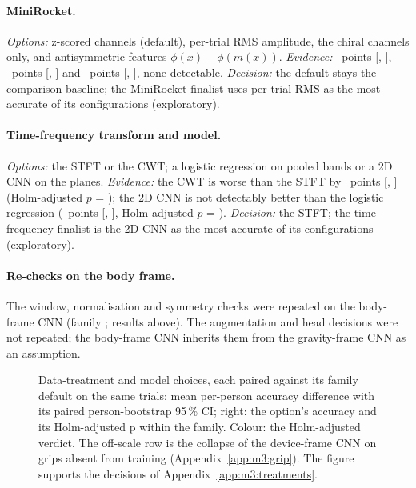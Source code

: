 \paragraph{MiniRocket.}
\emph{Options:} z-scored channels (default), per-trial RMS amplitude, the chiral channels only, and antisymmetric features $\phi(x) - \phi(m(x))$.
\emph{Evidence:} ~points [, ], ~points [, ] and ~points [, ], none detectable.
\emph{Decision:} the default stays the comparison baseline; the MiniRocket finalist uses per-trial RMS as the most accurate of its configurations (exploratory).

\paragraph{Time-frequency transform and model.}
\emph{Options:} the STFT or the CWT; a logistic regression on pooled bands or a 2D CNN on the planes.
\emph{Evidence:} the CWT is worse than the STFT by ~points [, ] (Holm-adjusted $p$ = ); the 2D CNN is not detectably better than the logistic regression (~points [, ], Holm-adjusted $p$ = ).
\emph{Decision:} the STFT; the time-frequency finalist is the 2D CNN as the most accurate of its configurations (exploratory).

\paragraph{Re-checks on the body frame.}
The window, normalisation and symmetry checks were repeated on the body-frame CNN (family ; results above).
The augmentation and head decisions were not repeated; the body-frame CNN inherits them from the gravity-frame CNN as an assumption.

\begin{figure}[tbp]
  \centering
  \caption{Data-treatment and model choices, each paired against its family default on the same trials: mean per-person accuracy difference with its paired person-bootstrap 95\,\% CI; right: the option's accuracy and its Holm-adjusted p within the family. Colour: the Holm-adjusted verdict. The off-scale row is the collapse of the device-frame CNN on grips absent from training (Appendix~\ref{app:m3:grip}). The figure supports the decisions of Appendix~\ref{app:m3:treatments}.}
  \label{fig:M3_03_treatments}\label{fig:app:m3-treatments}
\end{figure}

